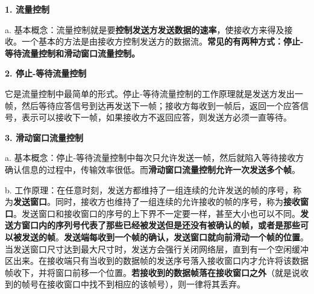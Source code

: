 {\textbf{1. 流量控制}}

a.
基本概念：流量控制就是要{\textbf{控制发送方发送数据的速率}}，使接收方来得及接收。一个基本的方法是由接收方控制发送方的数据流。\textbf{{常见的有两种方式：停止-等待流量控制和滑动窗口流量控制。}}

\textbf{{2. 停止-等待流量控制}}

它是流量控制中最简单的形式。停止-等待流量控制的工作原理就是发送方发出一帧，然后等待应答信号到达再发送下一帧；接收方每收到一帧后，返回一个应答信号，表示可以接收下一帧，如果接收方不返回应答，则发送方必须一直等待。

\textbf{{3. 滑动窗口流量控制}}

a.
基本概念：停止-等待流量控制中每次只允许发送一帧，然后就陷入等待接收方确认信息的过程中，传输效率很低。而{\textbf{滑动窗口流量控制允许一次发送多个帧}}。

b.
工作原理：在任意时刻，发送方都维持了一组连续的允许发送的帧的序号，称为\textbf{发送窗口}。同时，接收方也维持了一组连续的允许接收的帧的序号，称为\textbf{接收窗口}。发送窗口和接收窗口的序号的上下界不一定要一样，甚至大小也可以不同。\textbf{发送方窗口内的序列号代表了那些已经被发送但是还没有被确认的帧，或者是那些可以被发送的帧}。{\textbf{发送端每收到一个帧的确认，发送窗口就向前滑动一个帧的位置}。}当发送窗口尺寸达到最大尺寸时，发送方会强行关闭网络层，直到有一个空闲缓冲区出来。在接收端只有当收到的数据帧的发送序号落入接收窗口内才允许将该数据帧收下，并将窗口前移一个位置。\textbf{若接收到的数据帧落在接收窗口之外}（就是说收到的帧号在接收窗口中找不到相应的该帧号），则一律将其丢弃。
